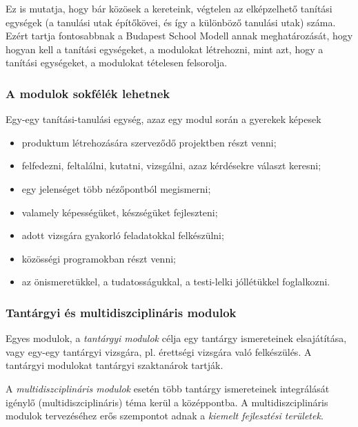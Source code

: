 Ez is mutatja, hogy bár közösek a kereteink, végtelen az elképzelhető
tanítási egységek (a tanulási utak építőkövei, és így a különböző
tanulási utak) száma. Ezért tartja fontosabbnak a Budapest School Modell
annak meghatározását, hogy hogyan kell a tanítási egységeket, a
modulokat létrehozni, mint azt, hogy a tanítási egységeket, a modulokat
tételesen felsorolja.

\hypertarget{modulok-sokfelek-lehetnek}{%
\subsubsection{A modulok sokfélék
lehetnek}\label{modulok-sokfelek-lehetnek}}

Egy-egy tanítási-tanulási egység, azaz egy modul során a gyerekek
képesek

\begin{itemize}
\tightlist
\item
  produktum létrehozására szerveződő projektben részt venni;
\item
  felfedezni, feltalálni, kutatni, vizsgálni, azaz kérdésekre választ
  keresni;
\item
  egy jelenséget több nézőpontból megismerni;
\item
  valamely képességüket, készségüket fejleszteni;
\item
  adott vizsgára gyakorló feladatokkal felkészülni;
\item
  közösségi programokban részt venni;
\item
  az önismeretükkel, a tudatosságukkal, a testi-lelki jóllétükkel
  foglalkozni.
\end{itemize}

\hypertarget{tantargyi-es-multidiszciplinaris-modulok}{%
\subsubsection{Tantárgyi és multidiszciplináris
modulok}\label{tantargyi-es-multidiszciplinaris-modulok}}

Egyes modulok, a \emph{tantárgyi modulok} célja egy tantárgy
ismereteinek elsajátítása, vagy egy-egy tantárgyi vizsgára, pl.
érettségi vizsgára való felkészülés. A tantárgyi modulokat tantárgyi
szaktanárok tartják.

A \emph{multidiszciplináris modulok} esetén több tantárgy ismereteinek
integrálását igénylő (multidiszciplináris) téma kerül a középpontba. A
multidiszciplináris modulok tervezéséhez erős szempontot adnak a
{\emph{kiemelt
fejlesztési területek}}.

